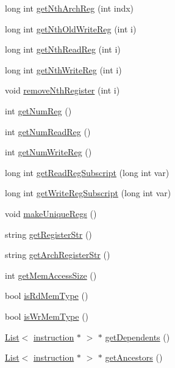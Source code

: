 \begin{DoxyCompactItemize}
\item 
long int \hyperlink{classinstruction_a7d49a66c0f3b426f1cf8fd335a5f3b6a}{getNthArchReg} (int indx)
\item 
long int \hyperlink{classinstruction_ad7dce7bff9bfecd11b0e7119738d0994}{getNthOldWriteReg} (int i)
\item 
long int \hyperlink{classinstruction_a0a5ddbb986096245d7742472c49d14b2}{getNthReadReg} (int i)
\item 
long int \hyperlink{classinstruction_a29e8de9d3cd22cee464512f9bbc1972c}{getNthWriteReg} (int i)
\item 
void \hyperlink{classinstruction_aabb46003e886f87cd3bc918f05a3682f}{removeNthRegister} (int i)
\item 
int \hyperlink{classinstruction_af64e1265e882da7e152bd47cb7794c3b}{getNumReg} ()
\item 
int \hyperlink{classinstruction_ae0a1ee97e6ba7920c41dd35f97b1715a}{getNumReadReg} ()
\item 
int \hyperlink{classinstruction_a293a8975be22485ec002ef7cc0466d0a}{getNumWriteReg} ()
\item 
long int \hyperlink{classinstruction_a7824d148fcdeb6a1b7cafd68a7ce99ef}{getReadRegSubscript} (long int var)
\item 
long int \hyperlink{classinstruction_a1253eafd0173b6daef17fed2311c6bcf}{getWriteRegSubscript} (long int var)
\item 
void \hyperlink{classinstruction_ae406e3e00f408b7b54510867c88b1b5d}{makeUniqueRegs} ()
\item 
string \hyperlink{classinstruction_acd4f756120e0bd6cdb127715c295a5e7}{getRegisterStr} ()
\item 
string \hyperlink{classinstruction_a4cbd72801622336cca5bf1061f3cda6a}{getArchRegisterStr} ()
\item 
int \hyperlink{classinstruction_a7811c2dd5418e30c53d2da2460e0d47c}{getMemAccessSize} ()
\item 
bool \hyperlink{classinstruction_abf5f8947b16c91c4e21b82bec378008f}{isRdMemType} ()
\item 
bool \hyperlink{classinstruction_a0eab1a0a392f17d7ec46e6dbf1ce21fb}{isWrMemType} ()
\item 
\hyperlink{classList}{List}$<$ \hyperlink{classinstruction}{instruction} $\ast$ $>$ $\ast$ \hyperlink{classinstruction_a93d58b1d8d2969d30dec5184ea22f988}{getDependents} ()
\item 
\hyperlink{classList}{List}$<$ \hyperlink{classinstruction}{instruction} $\ast$ $>$ $\ast$ \hyperlink{classinstruction_af6165d6c8ba00c6806eda36e36cb3366}{getAncestors} ()

\end{DoxyCompactItemize}
